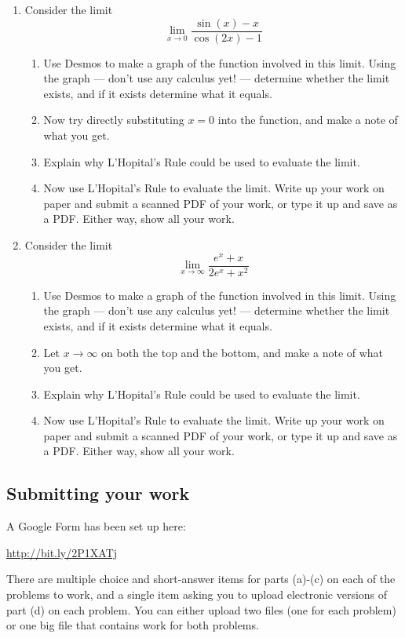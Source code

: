 \documentclass[11pt]{article}
\begin{document}
\begin{enumerate}
    \item Consider the limit 
    $$\lim_{x \to 0} \frac{\sin(x) -x}{\cos(2x)-1}$$
    \begin{enumerate}
        \item Use Desmos to make a graph of the function involved in this limit. Using the graph --- don't use any calculus yet! --- determine whether the limit exists, and if it exists determine what it equals. 
        \item Now try directly substituting $x = 0$ into the function, and make a note of what you get.
        \item Explain why L'Hopital's Rule could be used to evaluate the limit. 
        \item Now use L'Hopital's Rule to evaluate the limit. Write up your work on paper and submit a scanned PDF of your work, or type it up and save as a PDF. Either way, show all your work. 
    \end{enumerate}

    \item Consider the limit 
    $$\lim_{x \to \infty} \frac{e^x + x}{2e^x + x^2}$$
 \begin{enumerate}
        \item Use Desmos to make a graph of the function involved in this limit. Using the graph --- don't use any calculus yet! --- determine whether the limit exists, and if it exists determine what it equals. 
        \item Let $x \to \infty$ on both the top and the bottom, and make a note of what you get. 
        \item Explain why L'Hopital's Rule could be used to evaluate the limit. 
        \item Now use L'Hopital's Rule to evaluate the limit. Write up your work on paper and submit a scanned PDF of your work, or type it up and save as a PDF. Either way, show all your work. 
    \end{enumerate}
\end{enumerate}

\subsection*{Submitting your work}

A Google Form has been set up here: 
\begin{center}
   \url{http://bit.ly/2P1XATj}
\end{center}
There are multiple choice and short-answer items for parts (a)-(c) on each of the problems to work, and a single item asking you to upload electronic versions of part (d) on each problem. You can either upload two files (one for each problem) or one big file that contains work for both problems. 
\end{document}
